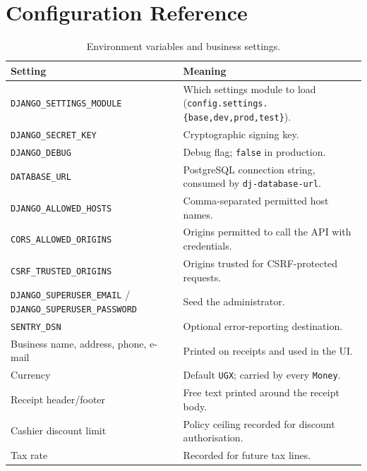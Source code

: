 \documentclass[11pt,a4paper]{article}
\begin{document}
\section{Configuration Reference}
\label{app:config}

\begin{table}[htbp]\centering
\small
\caption{Environment variables and business settings.}
\begin{tabular}{@{}p{}p{}@{}}
\toprule
\textbf{Setting} & \textbf{Meaning} \\
\midrule
\texttt{DJANGO\_SETTINGS\_MODULE} & Which settings module to load
(\texttt{config.settings.\{base,dev,prod,test\}}). \\
\texttt{DJANGO\_SECRET\_KEY} & Cryptographic signing key. \\
\texttt{DJANGO\_DEBUG} & Debug flag; \texttt{false} in production. \\
\texttt{DATABASE\_URL} & PostgreSQL connection string, consumed by \texttt{dj-database-url}. \\
\texttt{DJANGO\_ALLOWED\_HOSTS} & Comma-separated permitted host names. \\
\texttt{CORS\_ALLOWED\_ORIGINS} & Origins permitted to call the API with credentials. \\
\texttt{CSRF\_TRUSTED\_ORIGINS} & Origins trusted for CSRF-protected requests. \\
\texttt{DJANGO\_SUPERUSER\_EMAIL} / \texttt{DJANGO\_SUPERUSER\_PASSWORD} & Seed the administrator. \\
\texttt{SENTRY\_DSN} & Optional error-reporting destination. \\
Business name, address, phone, e-mail & Printed on receipts and used in the UI. \\
Currency & Default \texttt{UGX}; carried by every \texttt{Money}. \\
Receipt header/footer & Free text printed around the receipt body. \\
Cashier discount limit & Policy ceiling recorded for discount authorisation. \\
Tax rate & Recorded for future tax lines. \\
\bottomrule
\end{tabular}
\end{table}

\end{document}
